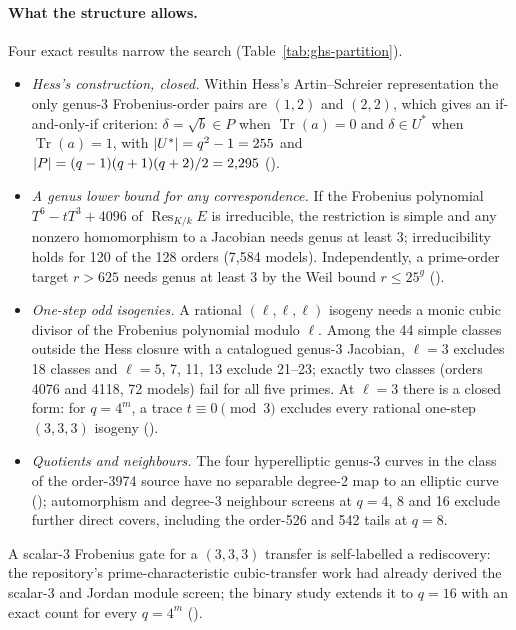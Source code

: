 \paragraph{What the structure allows.} Four exact results narrow the
search (Table~\ref{tab:ghs-partition}).
\begin{itemize}
\item \emph{Hess's construction, closed.} Within Hess's Artin--Schreier
  representation the only genus-3 Frobenius-order pairs are $(1,2)$ and
  $(2,2)$, which gives an if-and-only-if criterion: $\delta=\sqrt b\in P$
  when $\operatorname{Tr}(a)=0$ and $\delta\in U^*$ when
  $\operatorname{Tr}(a)=1$, with $\lvert U^* \rvert=q^2-1=255$ and
  $\lvert P \rvert=(q-1)(q+1)(q+2)/2=2{,}295$
  ().
\item \emph{A genus lower bound for any correspondence.} If the Frobenius
  polynomial $T^6-tT^3+4096$ of $\operatorname{Res}_{K/k}E$ is irreducible,
  the restriction is simple and any nonzero homomorphism to a Jacobian
  needs genus at least 3; irreducibility holds for 120 of the 128 orders
  (7{,}584 models). Independently, a prime-order target $r>625$ needs genus
  at least 3 by the Weil bound $r\le25^g$
  ().
\item \emph{One-step odd isogenies.} A rational $(\ell,\ell,\ell)$ isogeny
  needs a monic cubic divisor of the Frobenius polynomial modulo $\ell$.
  Among the 44 simple classes outside the Hess closure with a catalogued
  genus-3 Jacobian, $\ell=3$ excludes 18 classes and $\ell=5$, 7, 11, 13
  exclude 21--23; exactly two classes (orders 4076 and 4118, 72 models) fail
  for all five primes. At $\ell=3$ there is a closed form: for $q=4^m$, a
  trace $t\equiv0\pmod3$ excludes every rational one-step $(3,3,3)$ isogeny
  ().
\item \emph{Quotients and neighbours.} The four hyperelliptic genus-3 curves
  in the class of the order-3974 source have no separable degree-2 map to an
  elliptic curve ();
  automorphism and degree-3 neighbour screens at $q=4$, 8 and 16 exclude
  further direct covers, including the order-526 and 542 tails at $q=8$.
\end{itemize}
A scalar-3 Frobenius gate for a $(3,3,3)$ transfer is self-labelled a
rediscovery: the repository's prime-characteristic cubic-transfer work had
already derived the scalar-3 and Jordan module screen; the binary study
extends it to $q=16$ with an exact count for every $q=4^m$
().

